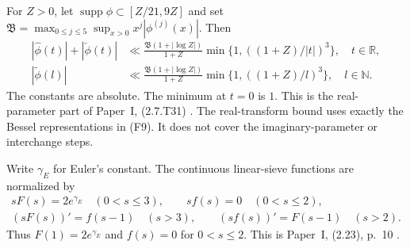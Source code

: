\begin{fact}\label{fact:real-transforms}
\leavevmode\par
For $Z>0$, let $\operatorname{supp}\phi\subset[Z/21,9Z]$ and set
$\mathfrak B=\max_{0\le j\le5}\sup_{x>0}x^j|\phi^{(j)}(x)|$.
Then
\begin{equation}\label{eq:real-transform-bound}
 \begin{aligned}
 |\widehat\phi(t)|+|\check\phi(t)|
 &\ll\frac{\mathfrak B(1+|\log Z|)}{1+Z}
       \min\{1,((1+Z)/|t|)^3\},\quad t\in\mathbb R,\\
 |\widetilde\phi(l)|
 &\ll\frac{\mathfrak B(1+|\log Z|)}{1+Z}
       \min\{1,((1+Z)/l)^3\},\quad l\in\mathbb N.
 \end{aligned}
\end{equation}
The constants are absolute. The minimum at $t=0$ is $1$.
This is the real-parameter part of Paper~I, (2.7.T31)
\cite[(2.12), (2.7.T31), pp.~8, 20]{PaperI}.
The real-transform bound uses exactly the Bessel representations
in (F9). It does not cover the imaginary-parameter or interchange steps.
\end{fact}

Write $\gamma_{\!E}$ for Euler's constant. The continuous linear-sieve
functions are normalized by
\begin{equation}\label{eq:classical-delay}
 \begin{gathered}
 sF(s)=2e^{\gamma_{\!E}}\quad(0<s\le3),\qquad
 sf(s)=0\quad(0<s\le2),\\
 (sF(s))'=f(s-1)\quad(s>3),\qquad
 (sf(s))'=F(s-1)\quad(s>2).
 \end{gathered}
\end{equation}
Thus $F(1)=2e^{\gamma_{\!E}}$ and $f(s)=0$ for $0<s\le2$.
This is Paper~I, (2.23), p.~10 \cite[(2.23), p.~10]{PaperI}.

